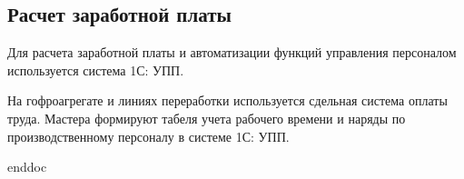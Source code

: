 \newpage
\subsection{Расчет заработной платы}



Для расчета заработной платы и автоматизации функций управления персоналом используется система 1С: УПП.

На гофроагрегате и линиях переработки используется сдельная система оплаты труда. Мастера формируют табеля учета рабочего времени и наряды по производственному персоналу в системе 1С: УПП.

\clearpage

 {enddoc}
\clearpage